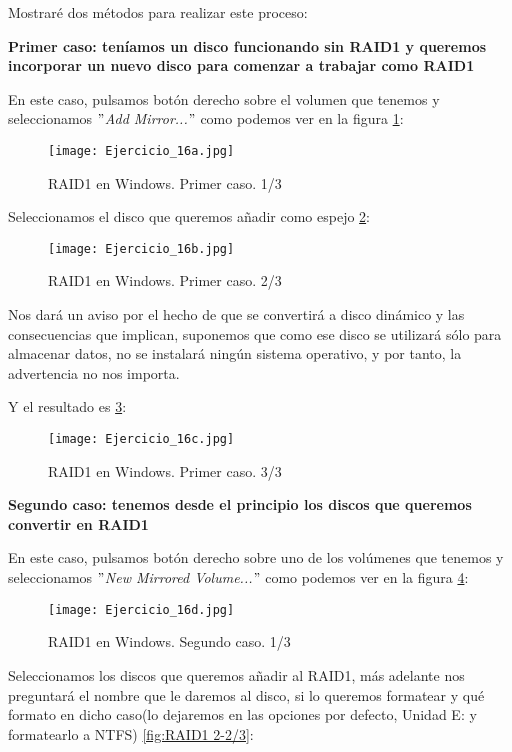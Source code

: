 \documentclass[paper=a4, fontsize=11pt]{scrartcl} %
\numberwithin{equation}{section} %
\numberwithin{figure}{section} %
\numberwithin{table}{section} %
\begin{document}
\begin{enumerate}
		Mostraré dos métodos para realizar este proceso: 
		
		\textbf{Primer caso: teníamos un disco funcionando sin RAID1 y queremos incorporar un nuevo
		disco para comenzar a trabajar como RAID1}
		
		En este caso, pulsamos botón derecho sobre el volumen que tenemos y seleccionamos
		\textit{$"$Add Mirror...$"$} como podemos ver en la figura \ref{fig:RAID1 1-1/3}:
		
		\begin{figure}[H]
			\centering
			\texttt{[image: Ejercicio\_16a.jpg]}
			\caption{RAID1 en Windows. Primer caso. 1/3} 	
			\label{fig:RAID1 1-1/3}
		\end{figure}

		Seleccionamos el disco que queremos añadir como espejo \ref{fig:RAID1 1-2/3}:
		
		\begin{figure}[H]
			\centering
			\texttt{[image: Ejercicio\_16b.jpg]}
			\caption{RAID1 en Windows. Primer caso. 2/3} 	
			\label{fig:RAID1 1-2/3}
		\end{figure}
		
		Nos dará un aviso por el hecho de que se convertirá a disco dinámico y las consecuencias que
		implican, suponemos que como ese disco se utilizará sólo para almacenar datos, no se instalará
		ningún sistema operativo, y por tanto, la advertencia no nos importa.
		
		Y el resultado es \ref{fig:RAID1 1-3/3}:
		
		\begin{figure}[H]
			\centering
			\texttt{[image: Ejercicio\_16c.jpg]}
			\caption{RAID1 en Windows. Primer caso. 3/3} 	
			\label{fig:RAID1 1-3/3}
		\end{figure}

		\textbf{Segundo caso: tenemos desde el principio los discos que queremos convertir en RAID1}
		
		En este caso, pulsamos botón derecho sobre uno de los volúmenes que tenemos y seleccionamos
		\textit{$"$New Mirrored Volume...$"$} como podemos ver en la figura \ref{fig:RAID1 2-1/3}:
		
		\begin{figure}[H]
			\centering
			\texttt{[image: Ejercicio\_16d.jpg]}
			\caption{RAID1 en Windows. Segundo caso. 1/3} 	
			\label{fig:RAID1 2-1/3}
		\end{figure}
		
		Seleccionamos los discos que queremos añadir al RAID1, más adelante nos preguntará el nombre
		que le daremos al disco, si lo queremos formatear y qué formato en dicho caso(lo dejaremos
		en las opciones por defecto, Unidad E: y formatearlo a NTFS) \ref{fig:RAID1 2-2/3}:
		

\end{enumerate}
\end{document}
